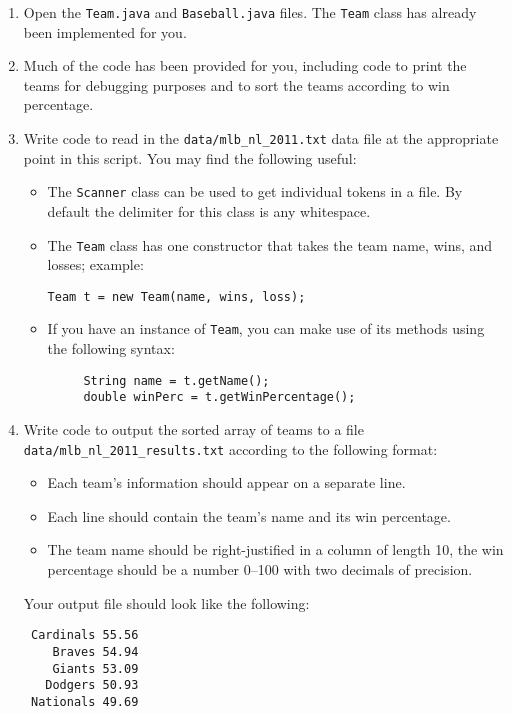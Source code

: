 \documentclass[12pt]{scrartcl}
\begin{document}
\begin{enumerate}
  \item Open the \texttt{Team.java} and 
  	\texttt{Baseball.java} files.  The \texttt{Team} 
	class has already been implemented for you.
  \item Much of the code has been provided for you, including code to 
	print the teams for debugging purposes and to sort the teams according 
	to win percentage.
  \item Write code to read in the \texttt{data/mlb_nl_2011.txt} 
	data file at the appropriate point in this script.  You may find the 
	following useful:
  \begin{itemize}
	\item The \texttt{Scanner} class can be used to get
	 individual tokens in a file.  By default the delimiter for this
	 class is any whitespace.  
	\item The \texttt{Team} class has one constructor 
	 that takes the team name, wins, and losses; example:
	 
	 \texttt{Team t = new Team(name, wins, loss);}
	 
    \item If you have an instance of \texttt{Team}, you can 
	 make use of its methods using the following syntax:
	 
	 \begin{verbatim}
	 String name = t.getName();
	 double winPerc = t.getWinPercentage();
	 \end{verbatim}
  \end{itemize}
	
  \item Write code to output the sorted array of teams to a file 
  	\texttt{data/mlb_nl_2011_results.txt} according 
	to the following format:
	\begin{itemize}
	  \item Each team's information should appear on a separate line.
	  \item Each line should contain the team's name and its win percentage.
      \item The team name should be right-justified in a column of length 
	  	10, the win percentage should be a number 0--100 with two decimals 
		of precision.
	\end{itemize}
	Your output file should look like the following:

\begin{verbatim}
 Cardinals 55.56
    Braves 54.94
    Giants 53.09
   Dodgers 50.93
 Nationals 49.69
\end{verbatim}


\end{enumerate}
\end{document}
